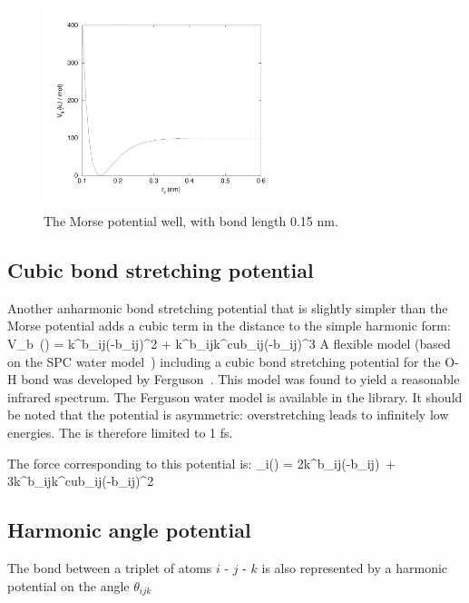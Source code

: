 \begin{figure}
\centerline{\includegraphics[width=7cm]{plots/f_morse}}
\caption{The Morse potential well, with bond length 0.15 nm.}
\label{fig:morse}
\end{figure}

\subsection{Cubic bond stretching potential}
Another anharmonic bond stretching potential that is slightly simpler
than the Morse potential adds a cubic term in the distance to the
simple harmonic form:
\beq
V_b~(\rij) = k^b_{ij}(\rij-b_{ij})^2 + k^b_{ij}k^{cub}_{ij}(\rij-b_{ij})^3
\eeq
A flexible  model (based on
the SPC water model~\cite{Berendsen81}) including 
a cubic bond stretching potential for the O-H bond
was developed by Ferguson~\cite{Ferguson95}. This model was found
to yield a reasonable infrared spectrum. The Ferguson water model is
available in the {\gromacs} library. 
It should be noted that the potential is asymmetric: overstretching leads to
infinitely low energies. The  is therefore
limited to 1 fs.

The force corresponding to this potential is:
\beq
{}_i(\rvij) = 2k^b_{ij}(\rij-b_{ij})~\rnorm + 3k^b_{ij}k^{cub}_{ij}(\rij-b_{ij})^2~\rnorm
\eeq

\subsection{Harmonic angle potential}
\label{sec:anglepot}
\newcommand{\tijk}{\theta_{ijk}}
The bond  between a triplet of atoms $i$ - $j$ - $k$
is also represented by a harmonic potential on the angle $\tijk$

